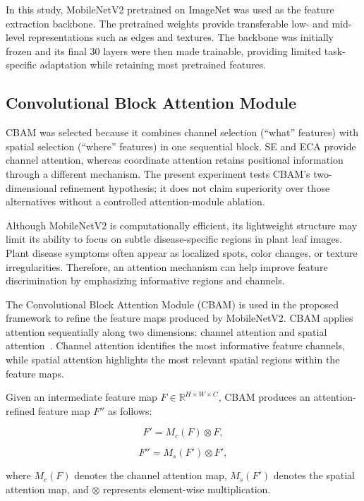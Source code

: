 In this study, MobileNetV2 pretrained on ImageNet was used as the feature extraction backbone. The pretrained weights provide transferable low- and mid-level representations such as edges and textures. The backbone was initially frozen and its final 30 layers were then made trainable, providing limited task-specific adaptation while retaining most pretrained features.

\subsection{Convolutional Block Attention Module}

CBAM was selected because it combines channel selection (``what'' features) with spatial selection (``where'' features) in one sequential block. SE and ECA provide channel attention, whereas coordinate attention retains positional information through a different mechanism. The present experiment tests CBAM's two-dimensional refinement hypothesis; it does not claim superiority over those alternatives without a controlled attention-module ablation.

Although MobileNetV2 is computationally efficient, its lightweight structure may limit its ability to focus on subtle disease-specific regions in plant leaf images. Plant disease symptoms often appear as localized spots, color changes, or texture irregularities. Therefore, an attention mechanism can help improve feature discrimination by emphasizing informative regions and channels.

The Convolutional Block Attention Module (CBAM) is used in the proposed framework to refine the feature maps produced by MobileNetV2. CBAM applies attention sequentially along two dimensions: channel attention and spatial attention~\cite{woo2018cbam}. Channel attention identifies the most informative feature channels, while spatial attention highlights the most relevant spatial regions within the feature maps.

Given an intermediate feature map $F \in \mathbb{R}^{H \times W \times C}$, CBAM produces an attention-refined feature map $F''$ as follows:

\begin{equation}
    F' = M_c(F) \otimes F,
\end{equation}

\begin{equation}
    F'' = M_s(F') \otimes F',
\end{equation}

where $M_c(F)$ denotes the channel attention map, $M_s(F')$ denotes the spatial attention map, and $\otimes$ represents element-wise multiplication.

